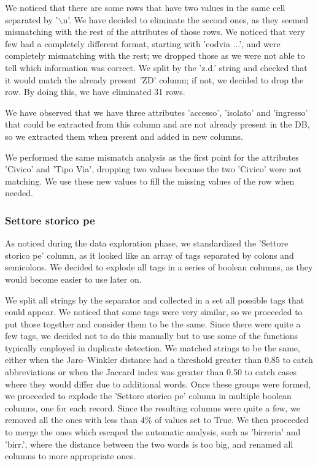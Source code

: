 \documentclass{article}
\begin{document}
We noticed that there are some rows that have two values in the same cell separated by '$\backslash$n'. We have decided to eliminate the second ones, as they seemed mismatching with the rest of the attributes of those rows. We noticed that very few had a completely different format, starting with 'codvia ...', and were completely mismatching with the rest; we dropped those as we were not able to tell which information was correct. We split by the 'z.d.' string and checked that it would match the already present 'ZD' column; if not, we decided to drop the row. By doing this, we have eliminated 31 rows. 

We have observed that we have three attributes 'accesso', 'isolato' and 'ingresso' that could be extracted from this column and are not already present in the DB, so we extracted them when present and added in new columns. 

We performed the same mismatch analysis as the first point for the attributes 'Civico' and 'Tipo Via', dropping two values because the two 'Civico' were not matching. We use these new values to fill the missing values of the row when needed.

\subsubsection{Settore storico pe}
As noticed during the data exploration phase, we standardized the 'Settore storico pe' column, as it looked like an array of tags separated by colons and semicolons. We decided to explode all tags in a series of boolean columns, as they would become easier to use later on.

We split all strings by the separator and collected in a set all possible tags that could appear. We noticed that some tags were very similar, so we proceeded to put those together and consider them to be the same. Since there were quite a few tags, we decided not to do this manually but to use some of the functions typically employed in duplicate detection. We matched strings to be the same, either when the Jaro–Winkler distance had a threshold greater than 0.85 to catch abbreviations or when the Jaccard index was greater than 0.50 to catch cases where they would differ due to additional words. Once these groups were formed, we proceeded to explode the 'Settore storico pe' column in multiple boolean columns, one for each record. Since the resulting columns were quite a few, we removed all the ones with less than 4\% of values set to True. We then proceeded to merge the ones which escaped the automatic analysis, such as 'birreria' and 'birr.', where the distance between the two words is too big, and renamed all columns to more appropriate ones.
\end{document}
